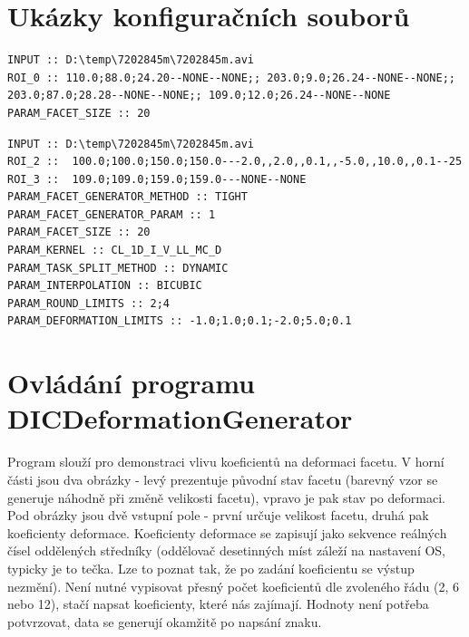 \documentclass[a4paper,12pt]{article}
\begin{document}
\section{Ukázky konfiguračních souborů}
\label{sec:configExample}
\begin{lstlisting}[title=Jednoduchý konfigurační soubor pro automatický výpočet]
INPUT :: D:\temp\7202845m\7202845m.avi
ROI_0 :: 110.0;88.0;24.20--NONE--NONE;; 203.0;9.0;26.24--NONE--NONE;; 203.0;87.0;28.28--NONE--NONE;; 109.0;12.0;26.24--NONE--NONE
PARAM_FACET_SIZE :: 20
\end{lstlisting}
\begin{lstlisting}[title=Plný konfigurační soubor pro automatický výpočet]
INPUT :: D:\temp\7202845m\7202845m.avi
ROI_2 ::  100.0;100.0;150.0;150.0---2.0,,2.0,,0.1,,-5.0,,10.0,,0.1--25
ROI_3 ::  109.0;109.0;159.0;159.0---NONE--NONE
PARAM_FACET_GENERATOR_METHOD :: TIGHT
PARAM_FACET_GENERATOR_PARAM :: 1
PARAM_FACET_SIZE :: 20
PARAM_KERNEL :: CL_1D_I_V_LL_MC_D
PARAM_TASK_SPLIT_METHOD :: DYNAMIC
PARAM_INTERPOLATION :: BICUBIC
PARAM_ROUND_LIMITS :: 2;4
PARAM_DEFORMATION_LIMITS :: -1.0;1.0;0.1;-2.0;5.0;0.1
\end{lstlisting}
\newpage
\section{Ovládání programu DIC\textunderscore DeformationGenerator}
\label{sec:generator}
\begin{figure}[H]
\end{figure}
Program slouží pro demonstraci vlivu koeficientů na deformaci facetu. V horní části jsou dva obrázky - levý prezentuje původní stav facetu (barevný vzor se generuje náhodně při změně velikosti facetu), vpravo je pak stav po deformaci. Pod obrázky jsou dvě vstupní pole - první určuje velikost facetu, druhá pak koeficienty deformace. Koeficienty deformace se zapisují jako sekvence reálných čísel oddělených středníky (oddělovač desetinných míst záleží na nastavení OS, typicky je to tečka. Lze to poznat tak, že po zadání koeficientu se výstup nezmění). Není nutné vypisovat přesný počet koeficientů dle zvoleného řádu (2, 6 nebo 12), stačí napsat koeficienty, které nás zajímají. Hodnoty není potřeba potvrzovat, data se generují okamžitě po napsání znaku.
\end{document}

